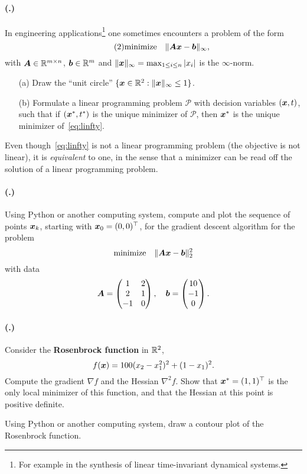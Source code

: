 \documentclass{article}
\newcounter{problemSheetNumber}
\newcounter{problems}
\renewcommand{\problem}{\paragraph{(\theproblemSheetNumber.\theproblems)}\addtocounter{problems}{1}}
\begin{document}
\problem 
In engineering applications\footnote{For example in the synthesis of linear time-invariant dynamical systems.} one sometimes encounters a problem of the form
\begin{equation}\label{eq:linfty}\tag{2}
 \text{minimize}\quad \Vert {\bm{A}\bm{x}-\bm{b}}\Vert_\infty,
\end{equation}
with $\bm{A}\in \mathbb{R}^{m\times n}$, $\bm{b}\in \mathbb{R}^m$ and $\Vert {\bm{x}}\Vert_\infty = \max_{1\leq i\leq n} |x_i|$ is the $\infty$-norm. 
\begin{itemize}
 \item[(a)] Draw the ``unit circle'' $\{\bm{x}\in \mathbb{R}^2 \mathrel{\mathop{:}} \Vert {\bm{x}}\Vert_\infty \leq 1\}$.
 \item[(b)] Formulate a linear programming problem $\mathcal{P}$ with decision variables $(\bm{x},t)$, such that if $(\bm{x}^*,t^*)$ is the unique minimizer of $\mathcal{P}$, then $\bm{x}^*$ is the unique minimizer of~\eqref{eq:linfty}. 
\end{itemize}
Even though~\eqref{eq:linfty} is not a linear programming problem (the objective is not linear), it is {\em equivalent} to one, in the sense that a minimizer can be read off the solution of a linear programming problem.


\problem Using Python or another computing system, compute and plot the sequence of points $\bm{x}_k$, starting with $\bm{x}_0=(0,0)^{\top}$, for the gradient descent algorithm for the problem
\begin{equation*}
 \text{minimize}\quad \Vert {\bm{A}\bm{x}-\bm{b}}\Vert_2^2
\end{equation*}
with data
 \begin{equation*}
  \bm{A} = \begin{pmatrix}
             1 & 2\\
             2 & 1\\
             -1 & 0
            \end{pmatrix},
\quad \bm{b} = \begin{pmatrix}
                 10\\-1\\0
                \end{pmatrix}.
 \end{equation*}
 
 \problem Consider the \textbf{Rosenbrock function} in $\mathbb{R}^2$,
 \begin{equation*}
   f(\bm{x}) = 100(x_2-x_1^2)^2 + (1-x_1)^2.
 \end{equation*}
 Compute the gradient $\nabla f$ and the Hessian $\nabla^2 f$. Show that $\bm{x}^*=(1,1)^{\top}$ is the only local minimizer of this function, and that the Hessian at this point is positive definite.
 
 Using Python or another computing system, draw a contour plot of the Rosenbrock function.
\end{document}
